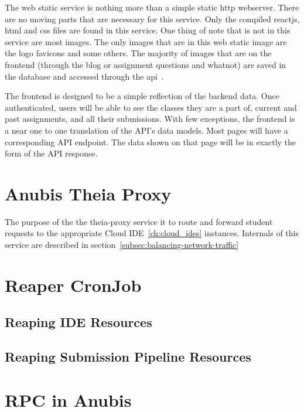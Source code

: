 The web static service is nothing more than a simple static http webserver.
There are no moving parts that are necessary for this service.
Only the compiled reactjs, html and css files are found in this service.
One thing of note that is not in this service are most images.
The only images that are in this web static image are the logo favicons
and some others.
The majority of images that are on the frontend (through the blog or assignment questions and whatnot)
are saved in the database and accessed through the api~.

The frontend is designed to be a simple reflection of the backend data.
Once authenticated, users will be able to see the classes they are a part of,
current and past assignments, and all their submissions.
With few exceptions, the frontend is a near one to one translation of the API's data models.
Most pages will have a corresponding API endpoint.
The data shown on that page will be in exactly the form of the API response.


\section{Anubis Theia Proxy}\label{sec:theia-proxy}

The purpose of the the theia-proxy service it to route and forward student requests
to the appropriate Cloud IDE~\ref{ch:cloud_ides} instances.
Internals of this service are described in section~\ref{subsec:balancing-network-traffic}

\section{Reaper CronJob}\label{sec:reaper}

\subsection{Reaping IDE Resources}\label{subsec:reaping-ide-resources}

\subsection{Reaping Submission Pipeline Resources}\label{subsec:reaping-submission-pipeline-resources}

\section{RPC in Anubis}\label{sec:rpc-in-anubis}

